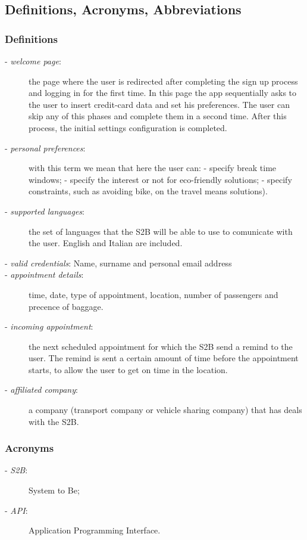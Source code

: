 \subsection{Definitions, Acronyms, Abbreviations}
	\subsubsection{Definitions}
		\begin{description}
			\item[- \textit{welcome page}:] the page where the user is redirected after completing the sign up process and logging in for the first time. In this page the app sequentially  asks to the user to insert credit-card data and set his preferences. The user can skip any of this phases and complete them in a second time. After this process, the initial settings configuration is completed.
			\item[- \textit{personal preferences}:] with this term we mean that here the user can:\newline
			- specify break time windows; \newline
			- specify the interest or not for eco-friendly solutions;\newline
			- specify constraints, such as avoiding  bike, on the travel means solutions).
			\item[- \textit{supported languages}:] the set of languages that the S2B will be able to use to comunicate with the user. English and Italian are included.
			\item[- \textit{valid credentials}: Name, surname and personal email address]
			\item[- \textit{appointment details}:] time, date, type of appointment, location, number of passengers and precence of baggage.
			\item[- \textit{incoming appointment}:] the next scheduled appointment for which the S2B send a remind to the user. The remind is sent  a certain amount of time before the appointment starts, to allow the user to get on time in the location.
			\item[- \textit{affiliated company}:] a company (transport company or vehicle sharing company) that has deals with the S2B.
		\end{description}
	\subsubsection{Acronyms}
		\begin{description}
		\item[- \textit{S2B}:] System to Be;
		\item[- \textit{API}:] Application Programming Interface.
	\end{description}
